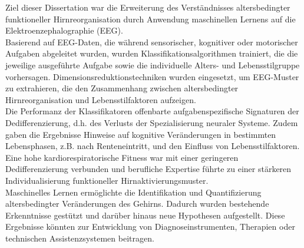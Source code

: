 Ziel dieser Dissertation war die Erweiterung des Verständnisses altersbedingter funktioneller Hirnreorganisation durch Anwendung maschinellen Lernens auf die Elektroenzephalographie (EEG).\\
Basierend auf EEG-Daten, die während sensorischer, kognitiver oder motorischer Aufgaben abgeleitet wurden, wurden Klassifikationsalgorithmen trainiert, die die jeweilige ausgeführte Aufgabe sowie die individuelle Alters- und Lebensstilgruppe vorhersagen. Dimensionsreduktionstechniken wurden eingesetzt, um EEG-Muster zu extrahieren, die den Zusammenhang zwischen altersbedingter Hirnreorganisation und Lebensstilfaktoren aufzeigen.\\
Die Performanz der Klassifikatoren offenbarte aufgabenspezifische Signaturen der Dedifferenzierung, d.h. des Verlusts der Spezialisierung neuraler Systeme. Zudem gaben die Ergebnisse Hinweise auf kognitive Veränderungen in bestimmten Lebensphasen, z.B. nach Renteneintritt, und den Einfluss von Lebensstilfaktoren. Eine hohe kardiorespiratorische Fitness war mit einer geringeren Dedifferenzierung verbunden und berufliche Expertise führte zu einer stärkeren Individualisierung funktioneller Hirnaktivierungsmuster.\\
Maschinelles Lernen ermöglichte die Identifikation und Quantifizierung altersbedingter Veränderungen des Gehirns. Dadurch wurden bestehende Erkenntnisse gestützt und darüber hinaus neue Hypothesen aufgestellt. Diese Ergebnisse könnten zur Entwicklung von Diagnoseinstrumenten, Therapien oder technischen Assistenzsystemen beitragen.